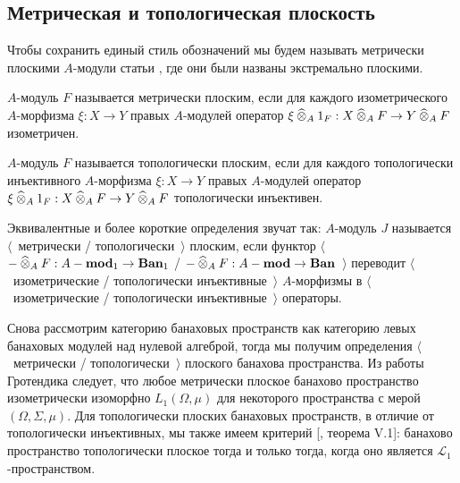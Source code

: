 
\subsection{Метрическая и топологическая плоскость}
\label{SubSectionMetricAndTopologicalFlatness}

Чтобы сохранить единый стиль обозначений мы будем называть метрически плоскими $A$-модули статьи \cite{HelMetrFlatNorMod}, где они были названы экстремально плоскими.

\begin{definition}\label{MetFlatMod} $A$-модуль $F$ называется метрически плоским, если для каждого изометрического $A$-морфизма $\xi:X\to Y$ правых $A$-модулей оператор $\xi\mathbin{\widehat{\otimes}}_{A} 1_F:X\mathbin{\widehat{\otimes}}_{A} F\to Y\mathbin{\widehat{\otimes}}_{A} F$ изометричен.
\end{definition}

\begin{definition}\label{TopFlatMod} $A$-модуль $F$ называется топологически плоским, если для каждого топологически инъективного $A$-морфизма $\xi:X\to Y$ правых $A$-модулей оператор $\xi\mathbin{\widehat{\otimes}}_{A} 1_F:X\mathbin{\widehat{\otimes}}_{A} F\to Y\mathbin{\widehat{\otimes}}_{A} F$ топологически инъективен.
\end{definition}

Эквивалентные и более короткие определения звучат так: $A$-модуль $J$ называется $\langle$~метрически / топологически~$\rangle$ плоским, если функтор $\langle$~$-\mathbin{\widehat{\otimes}}_{A} F:A-\mathbf{mod}_1\to\mathbf{Ban}_1$ / $-\mathbin{\widehat{\otimes}}_{A} F:A-\mathbf{mod}\to\mathbf{Ban}$~$\rangle$ переводит $\langle$~изометрические / топологически инъективные~$\rangle$ $A$-морфизмы в $\langle$~изометрические / топологически инъективные~$\rangle$ операторы.

Снова рассмотрим категорию банаховых пространств как категорию левых банаховых модулей над нулевой алгеброй, тогда
мы получим определения $\langle$~метрически / топологически~$\rangle$ плоского банахова пространства. Из работы Гротендика \cite{GrothMetrProjFlatBanSp} следует, что любое метрически плоское банахово пространство изометрически изоморфно $L_1(\Omega,\mu)$ для некоторого пространства с мерой $(\Omega,\Sigma,\mu)$. Для топологически плоских банаховых пространств, в отличие от топологически инъективных, мы также имеем критерий [\cite{StegRethNucOpL1LInfSp}, теорема V.1]: банахово пространство топологически плоское тогда и только тогда, когда оно является $\mathscr{L}_1$-пространством.

